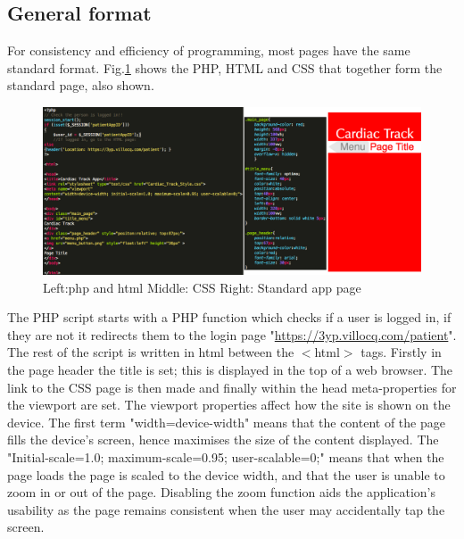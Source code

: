 \documentclass[11pt]{article}
\begin{document}
\subsection{General format}
For consistency and efficiency of programming, most pages have the same standard format. Fig.\ref{appstandard} shows the PHP, HTML and CSS that together form the standard page, also shown.
\begin{figure}[h!] 
\includegraphics[width=\linewidth]{appstandard.png}
\caption{Left:php and html Middle: CSS Right: Standard app page \label{appstandard}}
\end{figure} 
The PHP script starts with a PHP function which checks if a user is logged in, if they are not it redirects them to the login page "\url{https://3yp.villocq.com/patient}". 
\\ \indent
The rest of the script is written in html between the $<$html$>$ tags. Firstly in the page header the title is set; this is displayed in the top of a web browser. The link to the CSS page is then made and finally within the head meta-properties for the viewport are set. The viewport properties affect how the site is shown on the device. The first term "width=device-width" means that the content of the page fills the device's screen, hence maximises the size of the content displayed. The "Initial-scale=1.0; maximum-scale=0.95; user-scalable=0;" means that when the page loads the page is scaled to the device width, and that the user is unable to zoom in or out of the page. Disabling the zoom function aids the application's usability as the page remains consistent when the user may accidentally tap the screen. 
\\ \indent
\end{document}
